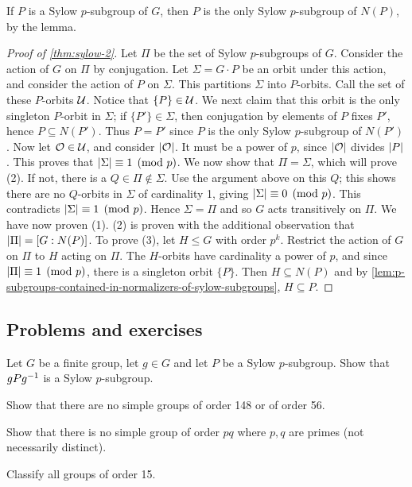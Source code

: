 \documentclass[./main.tex]{subfiles}
\begin{document}
If $P$ is a Sylow $p$-subgroup of $G$, then $P$ is the only Sylow
$p$-subgroup of $N(P)$, by the lemma. 


\begin{proof}[Proof of \cref{thm:sylow-2}]
    Let $\Pi$ be the set of Sylow $p$-subgroups of $G$. Consider the action of
    $G$ on $\Pi$ by conjugation. Let $\Sigma = G \cdot P$ be an orbit under this
    action, and consider the action of $P$ on $\Sigma$. This partitions $\Sigma$
    into $P$-orbits. Call the set of these $P$-orbits $\mathcal{U}$. Notice that
    $\{P\} \in \mathcal{U}$. We next claim that this orbit is the only singleton
    $P$-orbit in $\Sigma$; if $\{ P'\} \in \Sigma$, then conjugation by elements
    of $P$ fixes $P'$, hence $P \subseteq N(P')$. Thus $P = P'$ since $P$ is the
    only Sylow $p$-subgroup of $N(P')$. Now let $\mathcal{O} \in \mathcal{U}$, and consider
    $\abs {\mc O}$. It must be a power of $p$, since $\abs{\mc O}$ divides $\abs
    P$. This proves that $\abs{\Sigma} \equiv 1 \pmod p$. We now show that $\Pi
    = \Sigma$, which will prove (2). If not, there is a $Q \in \Pi \not\in
    \Sigma$. Use the argument above on this $Q$; this shows there are no
    $Q$-orbits in $\Sigma$ of cardinality 1, giving $\abs{\Sigma} \equiv 0 \pmod
    p$. This contradicts $\abs{\Sigma} \equiv 1 \pmod p$. Hence $\Sigma = \Pi$
    and so $G$ acts transitively on $\Pi$. We have now proven (1). (2) is proven
    with the additional observation that $\abs{\Pi} = [G:N(P)]$. To prove (3),
    let $H \leq G$ with order $p^k$. Restrict the action of $G$ on $\Pi$ to $H$
    acting on $\Pi$. The $H$-orbits have cardinality a power of $p$, and since
    $\abs{\Pi} \equiv 1 \pmod p$, there is a singleton orbit $\{P\}$. Then $H
    \subseteq N(P)$ and by
    \cref{lem:p-subgroups-contained-in-normalizers-of-sylow-subgroups}, $H
    \subseteq P$.
\end{proof}





\subsection{Problems and exercises}
\begin{exercise}
\label{ex:conjugate-of-sylow-subgroup}
    Let $G$ be a finite group, let $g \in G$ and let $P$ be a Sylow
    $p$-subgroup. Show that $gPg^{-1}$ is a Sylow $p$-subgroup.
\end{exercise}

\begin{exercise}
    Show that there are no simple groups of order 148 or of order 56.
\end{exercise}

\begin{exercise}
    Show that there is no simple group of order $pq$ where $p,q$ are primes (not
    necessarily distinct).
\end{exercise}

\begin{exercise}
    Classify all groups of order 15.
\end{exercise}
\end{document}
